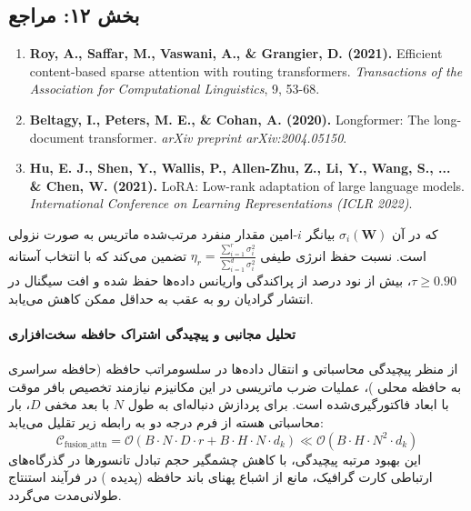 
\subsection*{بخش ۱۲: مراجع }
\begin{latin}
\begin{enumerate}
    \item \textbf{Roy, A., Saffar, M., Vaswani, A., \& Grangier, D. (2021).} Efficient content-based sparse attention with routing transformers. \textit{Transactions of the Association for Computational Linguistics}, 9, 53-68.
    \item \textbf{Beltagy, I., Peters, M. E., \& Cohan, A. (2020).} Longformer: The long-document transformer. \textit{arXiv preprint arXiv:2004.05150}.
    \item \textbf{Hu, E. J., Shen, Y., Wallis, P., Allen-Zhu, Z., Li, Y., Wang, S., ... \& Chen, W. (2021).} LoRA: Low-rank adaptation of large language models. \textit{International Conference on Learning Representations (ICLR 2022)}.
\end{enumerate}
\end{latin}

که در آن $\sigma_i(\mathbf{W})$ بیانگر $i$-امین مقدار منفرد مرتب‌شده ماتریس به صورت نزولی است. نسبت حفظ انرژی طیفی $\eta_r = \frac{\sum_{i=1}^r \sigma_i^2}{\sum_{i=1}^{d} \sigma_i^2}$ تضمین می‌کند که با انتخاب آستانه $\tau \ge 0.90$، بیش از نود درصد از پراکندگی واریانس داده‌ها حفظ شده و افت سیگنال در انتشار گرادیان رو به عقب به حداقل ممکن کاهش می‌یابد.

\paragraph{تحلیل مجانبی و پیچیدگی اشتراک حافظه سخت‌افزاری}
از منظر پیچیدگی محاسباتی و انتقال داده‌ها در سلسومراتب حافظه (حافظه سراسری  به حافظه محلی )، عملیات ضرب ماتریسی در این مکانیزم نیازمند تخصیص بافر موقت با ابعاد فاکتورگیری‌شده است. برای پردازش دنباله‌ای به طول $N$ با بعد مخفی $D$، بار محاسباتی هسته از فرم درجه دو به رابطه زیر تقلیل می‌یابد:
\begin{equation}
\label{eq:complexity_fusion_attn}
\mathcal{C}_{\text{fusion\_attn}} = \mathcal{O}\left( B \cdot N \cdot D \cdot r + B \cdot H \cdot N \cdot d_k \right) \ll \mathcal{O}\left( B \cdot H \cdot N^2 \cdot d_k \right)
\end{equation}
این بهبود مرتبه پیچیدگی، با کاهش چشمگیر حجم تبادل تانسورها در گذرگاه‌های ارتباطی کارت گرافیک، مانع از اشباع پهنای باند حافظه (پدیده ) در فرآیند استنتاج طولانی‌مدت می‌گردد.